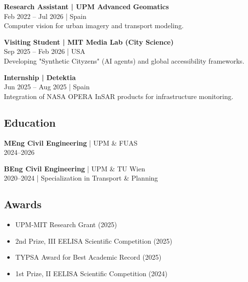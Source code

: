 \documentclass[11pt]{article}
\begin{document}
\begin{tcolorbox}[colback=CVBg, colframe=white, boxrule=0pt, arc=5pt]
\begin{minipage}[t]{0.64\textwidth}
        \vspace{0.5em}
        
        \textbf{Research Assistant | UPM Advanced Geomatics} \\
        {\footnotesize Feb 2022 – Jul 2026 | Spain} \\
        {\small Computer vision for urban imagery and transport modeling.}

        \vspace{0.5em}

        \textbf{Visiting Student | MIT Media Lab (City Science)} \\
        {\footnotesize Sep 2025 – Feb 2026 | USA} \\
        {\small Developing "Synthetic Cityzens" (AI agents) and global accessibility frameworks.}
        
        \vspace{0.5em}
        
        \textbf{Internship | Detektia} \\
        {\footnotesize Jun 2025 – Aug 2025 | Spain} \\
        {\small Integration of NASA OPERA InSAR products for infrastructure monitoring.}
        
        \subsection*{Education}
        \textbf{MEng Civil Engineering} | UPM \& FUAS \\
        {\footnotesize 2024–2026}
        
        \textbf{BEng Civil Engineering} | UPM \& TU Wien \\
        {\footnotesize 2020–2024 | Specialization in Transport \& Planning}

        \subsection*{Awards}
        {\small
        \begin{itemize}
            \item UPM-MIT Research Grant (2025)
            \item 2nd Prize, III EELISA Scientific Competition (2025)
            \item TYPSA Award for Best Academic Record (2025)
            \item 1st Prize, II EELISA Scientific Competition (2024)
        \end{itemize}
        }
    \end{minipage}
\end{tcolorbox}
\newpage
\end{document}
